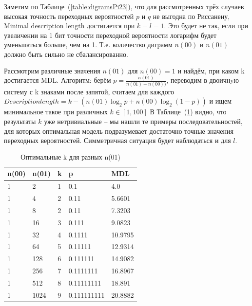\documentclass[12pt]{article}
\begin{document}
	Заметим по Таблице~(\ref{table:digramsPi23}), что для рассмотренных трёх случаев высокая точность переходных вероятностей $p$ и $q$ не выгодна по Риссанену, Minimal description length достигается при $k=l=1$. Это будет не так, если при увеличении на 1 бит точности переходной вероятности логарифм будет уменьшаться больше, чем на 1. Т.е. количество диграмм $n(00)$ и $n(01)$ должно быть сильно не сбалансированно. %
	
	Рассмотрим различные значения $n(01)$ для $n(00)=1$ и найдём, при каком k достигается MDL. Алгоритм: берём $p = \frac{n(01)}{n(01)+n(00))}$, переводим в двоичнyю систему с k знаками после запятой, считаем для каждого $Description length = k - (n(01)\log_2{p}+n(00)\log_2{(1-p)})$ и ищем минимальное такое при различных $k\in[1,100]$ В Таблице~(\ref{table:n00n01}) видно, что результаты $k$ уже нетривиальные -- мы нашли те примеры последовательностей, для которых оптимальная модель подразумевает достаточно точные значения переходных вероятностей. Симметричная ситуация будет наблюдаться и для $l$.
	
	\begin{table}[!h]
		\caption{Оптимальные k для разных n(01)}
		\label{table:n00n01}
		\begin{center}
			\begin{tabular}{|l|l|l|l|l|}
				\hline
				n(00) & n(01) & k & p & MDL \\
				\hline
				1 & 2 & 1 & 0.1 & 4.0 \\ 
				\hline 
				1 & 4 & 2 & 0.11 & 5.6601 \\ 
				\hline 
				1 & 8 & 2 & 0.11 & 7.3203 \\ 
				\hline 
				1 & 16 & 3 & 0.111 & 9.0823 \\ 
				\hline 
				1 & 32 & 4 & 0.1111 & 10.9795 \\ 
				\hline 
				1 & 64 & 5 & 0.11111 & 12.9314 \\ 
				\hline 
				1 & 128 & 6 & 0.111111 & 14.9082 \\ 
				\hline 
				1 & 256 & 7 & 0.1111111 & 16.8967 \\ 
				\hline 
				1 & 512 & 8 & 0.11111111 & 18.891 \\ 
				\hline 
				1 & 1024 & 9 & 0.111111111 & 20.8882 \\ 
				\hline 
			\end{tabular}
		\end{center}
	\end{table}
\end{document}
